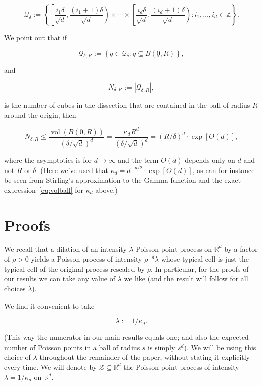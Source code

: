 \documentclass[11pt]{article}%
\newcommand{\Qcal}[0]{\ensuremath{{\mathcal Q}}}
\newcommand{\Zcal}[0]{\ensuremath{{\mathcal Z}}}
\newcommand{\eR}[0]{\ensuremath{ \mathbb R}}
\newcommand{\Zed}[0]{\ensuremath{ \mathbb Z}}
\newcommand{\orig}{\underline{0}}
\DeclareMathOperator{\vol}{vol}
\begin{document}
$$ \Qcal_\delta := \left\{ 
\left[\frac{i_1\delta}{\sqrt{d}}, \frac{(i_1+1)\delta}{\sqrt{d}}\right) \times \cdots \times
\left[\frac{i_d\delta}{\sqrt{d}}, \frac{(i_d+1)\delta}{\sqrt{d}}\right) :
i_1,\dots, i_d \in \Zed \right\}. $$

\noindent
We point out that if 

$$ \Qcal_{\delta,R} := \left\{ q \in \Qcal_\delta : q \subseteq B(\orig,R) \right\}, $$

\noindent 
and 

\begin{equation}\label{eq:Ndef}
 N_{\delta,R} := \left| \Qcal_{\delta,R}\right|, 
\end{equation}

\noindent
is the number of cubes in the dissection that are contained in the ball of radius $R$ around the origin, then 

\begin{equation}\label{eq:Nub} 
N_{\delta,R} \leq \frac{\vol(B(\orig,R))}{(\delta/\sqrt{d})^d}
 = \frac{\kappa_d R^d}{(\delta/\sqrt{d})^d} = (R/\delta)^d \cdot \exp[  O(d) ],
\end{equation}

\noindent
where the asymptotics is for $d \to \infty$ and the term $O(d)$ 
depends only on $d$ and not $R$ or $\delta$. (Here we've used that 
$\kappa_d = d^{-d/2} \cdot \exp\left[  O(d) \right]$, as can for instance be seen
from Stirling's approximation to the Gamma function and the exact expression~\eqref{eq:volball} for $\kappa_d$ above.)


\section{Proofs}


We recall that a dilation of an intensity $\lambda$ Poisson point process on $\eR^d$ by a factor of
$\rho>0$ yields a Poisson process of intensity $\rho^{-d}\lambda$ whose typical cell is 
just the typical cell of the original process rescaled by $\rho$.
In particular, for the proofs of our results we can take any value of $\lambda$ 
we like (and the result will follow for all choices $\lambda$).

We find it convenient to take 

$$\lambda := 1/\kappa_d.$$ 

\noindent
(This way the numerator in our main results equals one; and also 
the expected number of Poisson points in a ball of radius $s$ is simply $s^d$).
We will be using this choice of $\lambda$ throughout the remainder of the paper, without 
stating it explicitly every time.
We will denote by $\Zcal \subseteq \eR^d$ the Poisson point process of intensity $\lambda = 1/\kappa_d$ on $\eR^d$.
\end{document}
